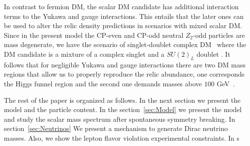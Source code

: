 \documentclass[12pt]{article}
\begin{document}
In contrast to fermion DM, the scalar DM candidate has additional interaction terms to the Yukawa and gauge interactions. This entails that the later ones can be used to alter the relic density predictions in scenarios with mixed scalar DM. Since in the present model the CP-even and CP-odd neutral $Z_2$-odd particles are mass degenerate, we have the scenario of singlet-doublet complex DM~\cite{Kadastik:2009dj,Belanger:2012vp} where the DM candidate is a mixture of a complex singlet \cite{McDonald:1993ex} and a $SU(2)_L$ doublet \cite{Deshpande:1977rw,Barbieri:2006dq}. It follows that for negligible Yukawa and gauge interactions there are two DM mass regions that allow us to properly reproduce the relic abundance, one corresponds the Higgs funnel region and the second one demands masses above $100$ GeV~\cite{Kakizaki:2016dza}. 




The rest of the paper is organized as follows. In the next section we present the model and the particle content. In the section~\ref{sec:Model} we present the model and study the scalar mass spectrum after spontaneous symmetry breaking. In section~\ref{sec:Neutrinos} We present a mechanism to generate Dirac neutrino masses. Also, we show the lepton flavor violation experimental  constraints. In s
\end{document}
